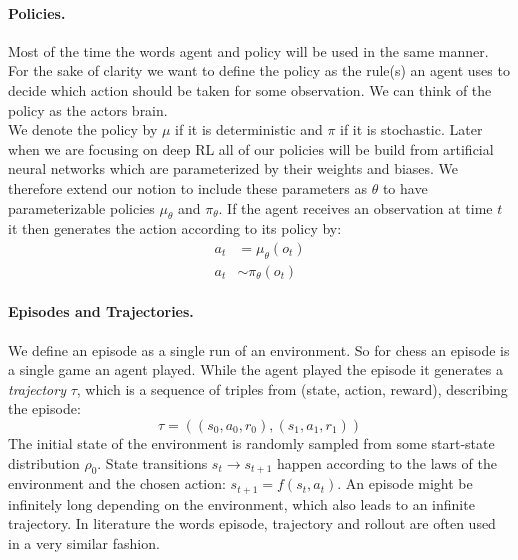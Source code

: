 \paragraph{Policies.}
Most of the time the words agent and policy will be used in the same manner. For the sake of clarity we want to define the policy as the rule(s) an agent uses to decide which action should be taken for some observation. We can think of the policy as the actors brain. \\
We denote the policy by $\mu$ if it is deterministic and $\pi$ if it is stochastic. Later when we are focusing on deep RL all of our policies will be build from artificial neural networks which are parameterized by their weights and biases. We therefore extend our notion to include these parameters as $\theta$ to have parameterizable policies $\mu_\theta$ and $\pi_\theta$. If the agent receives an observation at time $t$ it then generates the action according to its policy by:
\begin{align*}
  a_t &= \mu_\theta(o_t) \\
  a_t &\sim \pi_\theta(o_t)
\end{align*}


\paragraph{Episodes and Trajectories.}
We define an episode as a single run of an environment. So for chess an episode is a single game an agent played. While the agent played the episode it generates a \textit{trajectory} $\tau$, which is a sequence of triples from (state, action, reward), describing the episode:
\[\tau = ((s_0, a_0, r_0),  (s_1, a_1, r_1)) \]
The initial state of the environment is randomly sampled from some start-state distribution $\rho_0$. State transitions $s_t \rightarrow s_{t+1}$ happen according to the laws of the environment and the chosen action: $s_{t+1} = f(s_t, a_t)$. An episode might be infinitely long depending on the environment, which also leads to an infinite trajectory. In literature the words episode, trajectory and rollout are often used in a very similar fashion. 


